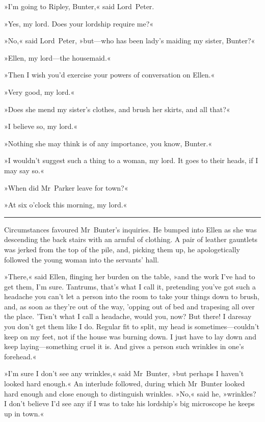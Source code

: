 »I'm going to Ripley, Bunter,« said Lord~Peter.

»Yes, my lord. Does your lordship require me?«

»No,« said Lord~Peter, »but—who has been lady's maiding my sister, Bunter?«

»Ellen, my lord—the housemaid.«

»Then I wish you'd exercise your powers of conversation on Ellen.«

»Very good, my lord.«

»Does she mend my sister's clothes, and brush her skirts, and all that?«

»I believe so, my lord.«

»Nothing she may think is of any importance, you know, Bunter.«

»I wouldn't suggest such a thing to a woman, my lord. It goes to their heads, if I may say so.«

»When did Mr~Parker leave for town?«

»At six o'clock this morning, my lord.«

\noindent\hfil\rule{0.5\textwidth}{.4pt}\hfil

Circumstances favoured Mr~Bunter's inquiries. He bumped into Ellen as she was descending the back stairs with an armful of clothing. A pair of leather gauntlets was jerked from the top of the pile, and, picking them up, he apologetically followed the young woman into the servants' hall.

»There,« said Ellen, flinging her burden on the table, »and the work I've had to get them, I'm sure. Tantrums, that's what I call it, pretending you've got such a headache you can't let a person into the room to take your things down to brush, and, as soon as they're out of the way, 'opping out of bed and trapesing all over the place.  'Tisn't what I call a headache, would you, now? But there! I daresay you don't get them like I do. Regular fit to split, my head is sometimes—couldn't keep on my feet, not if the house was burning down.  I just have to lay down and keep laying—something cruel it is. And gives a person such wrinkles in one's forehead.«

»I'm sure I don't see any wrinkles,« said Mr~Bunter, »but perhaps I haven't looked hard enough.« An interlude followed, during which Mr~Bunter looked hard enough and close enough to distinguish wrinkles.  »No,« said he, »wrinkles? I don't believe I'd see any if I was to take his lordship's big microscope he keeps up in town.«

